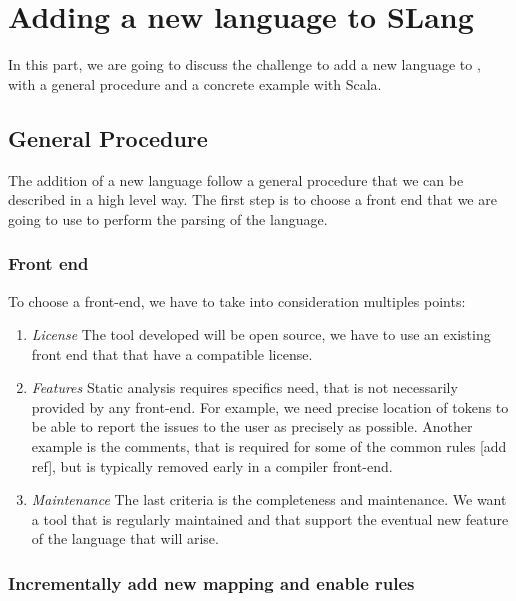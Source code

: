 \section{Adding a new language to SLang}
\label{sec:new_language}

In this part, we are going to discuss the challenge to add a new language to \slang{}, with a general procedure and a concrete example with Scala.

\subsection{General Procedure}
\label{subsec:general_procedure}

The addition of a new language follow a general procedure that we can be described in a high level way. 
The first step is to choose a front end that we are going to use to perform the parsing of the language. 

\subsubsection{Front end}
\label{subsubsec:front_end}

To choose a front-end, we have to take into consideration multiples points:
\begin{enumerate}
	\item \textit{License} \newline The tool developed will be open source, we have to use an existing front end that that have a compatible license.
	\item \textit{Features} \newline Static analysis requires specifics need, that is not necessarily provided by any front-end. 	For example, we need precise location of tokens to be able to report the issues to the user as precisely as possible. Another example is the comments, that is required for some of the common rules [add ref], but is typically removed early in a compiler front-end. 
	\item \textit{Maintenance} \newline 
	The last criteria is the completeness and maintenance. We want a tool that is regularly maintained and that support the eventual new feature of the language that will arise. 
\end{enumerate}

\subsubsection{Incrementally add new mapping and enable rules}
\label{subsubsec:new_mapping_and_enables_rules}

